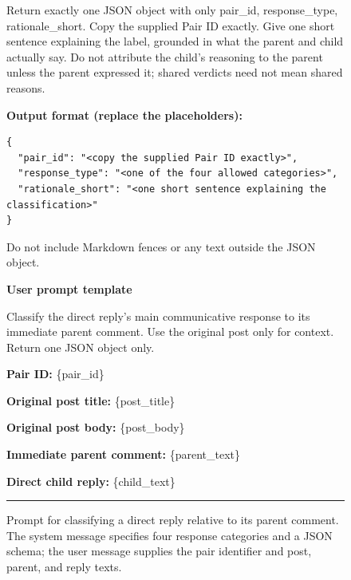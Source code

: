 \begin{figure}[H]
\begin{minipage}{0.97\textwidth}
Return exactly one JSON object with only pair\_id, response\_type, rationale\_short. Copy the supplied Pair ID exactly. Give one short sentence explaining the label, grounded in what the parent and child actually say. Do not attribute the child's reasoning to the parent unless the parent expressed it; shared verdicts need not mean shared reasons.

\textbf{Output format (replace the placeholders):}
\begin{verbatim}
{
  "pair_id": "<copy the supplied Pair ID exactly>",
  "response_type": "<one of the four allowed categories>",
  "rationale_short": "<one short sentence explaining the classification>"
}
\end{verbatim}

Do not include Markdown fences or any text outside the JSON object.

\textbf{User prompt template}

Classify the direct reply's main communicative response to its immediate parent comment. Use the original post only for context. Return one JSON object only.

\textbf{Pair ID:} \{pair\_id\}

\textbf{Original post title:} \{post\_title\}

\textbf{Original post body:} \{post\_body\}

\textbf{Immediate parent comment:} \{parent\_text\}

\textbf{Direct child reply:} \{child\_text\}

\vspace{0.6em}
\hrule
\end{minipage}

\caption{Prompt for classifying a direct reply relative to its parent
comment. The system message specifies four response categories and a JSON
schema; the user message supplies the pair identifier and post, parent, and
reply texts.}
\label{fig:rq2-prompt}
\end{figure}
